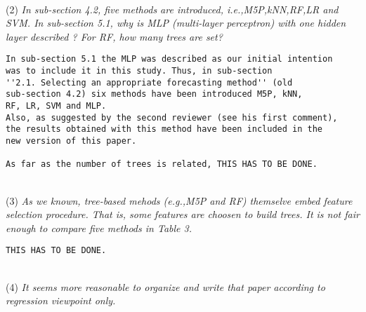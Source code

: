 \documentclass[preprint]{elsarticle}
\begin{document}
~\\
\noindent (2) \emph{In sub-section 4.2, five methods are introduced, i.e.,M5P,kNN,RF,LR and SVM. In sub-section 5.1, why is MLP (multi-layer perceptron) with one hidden layer described ? For RF, how many trees are set? } 

\begin{verbatim}
In sub-section 5.1 the MLP was described as our initial intention 
was to include it in this study. Thus, in sub-section 
''2.1. Selecting an appropriate forecasting method'' (old 
sub-section 4.2) six methods have been introduced M5P, kNN, 
RF, LR, SVM and MLP.
Also, as suggested by the second reviewer (see his first comment), 
the results obtained with this method have been included in the 
new version of this paper.

As far as the number of trees is related, THIS HAS TO BE DONE.
\end{verbatim}
~\\
\noindent (3) \emph{As we known, tree-based mehods (e.g.,M5P and RF) themselve embed feature selection procedure. That is, some features are choosen to build trees. It is not fair enough to compare five methods in Table 3. } 

\begin{verbatim}
THIS HAS TO BE DONE.
\end{verbatim}

~\\
\noindent (4) \emph{It seems more reasonable to organize and write that paper according to regression viewpoint only. } 
\end{document}
